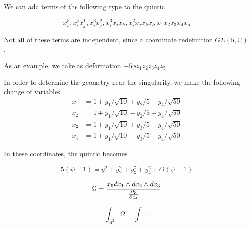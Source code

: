 We can add terms of the following type to the quintic

\begin{equation}
  x_i^5, x_i^4 x_j^1, x_i^3 x_j^2, x_i^3 x_j x_k, x_i^2 x_j x_k x_l, x_1 x_2 x_3 x_4 x_5
\end{equation}

Not all of these terms are independent, since a coordinate redefinition $GL(5,\mathbb C)$.




As an example, we take as deformation $-5\phi z_1 z_2 z_3 z_4 z_5$




In order to determine the geometry near the singularity, we make the following change of 
variables
\begin{equation}
  \begin{aligned}
  x_1 &= 1 + y_1/\sqrt{10} + y_2/5 + y_4/\sqrt{50}\\
  x_2 &= 1 + y_1/\sqrt{10} - y_2/5 + y_4/\sqrt{50}\\
  x_3 &= 1 + y_1/\sqrt{10} + y_3/5 - y_4/\sqrt{50}\\
  x_4 &= 1 + y_1/\sqrt{10} - y_3/5 - y_4/\sqrt{50}
  \end{aligned}
\end{equation}

In these coordinates, the quintic becomes

\begin{equation}
  5(\psi -1 ) =  y_1^2 + y_2^2 + y_3^2 + y_4^2 + O( \psi -1 )
\end{equation}






\begin{equation}
  \Omega = \frac{x_5 dx_1 \wedge dx_2\wedge dx_3}{\pdv{p}{x_4}}
\end{equation}


\begin{equation}
  \int_{A^2} \Omega = \int  \dots
\end{equation}








